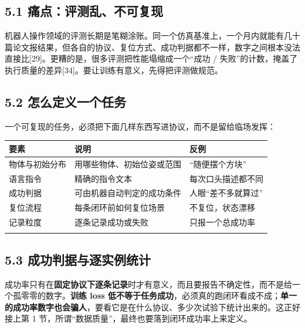 \documentclass[
  chinese,
]{ctexart}
\begin{document}
\subsection{5.1
痛点：评测乱、不可复现}\label{ux75dbux70b9ux8bc4ux6d4bux4e71ux4e0dux53efux590dux73b0}

机器人操作领域的评测长期是笔糊涂账。同一个仿真基准上，一个月内就能有几十篇论文报结果，但各自的协议、复位方式、成功判据都不一样，数字之间根本没法直接比{[}29{]}。更糟的是，很多评测把性能塌缩成一个``成功
/
失败''的计数，掩盖了执行质量的差异{[}34{]}。要让训练有意义，先得把评测做规范。

\subsection{5.2
怎么定义一个任务}\label{ux600eux4e48ux5b9aux4e49ux4e00ux4e2aux4efbux52a1}

一个可复现的任务，必须把下面几样东西写进协议，而不是留给临场发挥：

\begin{center}
\begin{tabular}{@{}>{\raggedright\arraybackslash}p{} >{\raggedright\arraybackslash}p{} >{\raggedright\arraybackslash}p{}@{}}
\toprule\noalign{}
要素 & 说明 & 反例 \\
\midrule\noalign{}
物体与初始分布 & 用哪些物体、初始位姿或范围 & ``随便摆个方块'' \\
语言指令 & 精确的指令文本 & 每次口头描述都不同 \\
成功判据 & 可由机器自动判定的成功条件 & 人眼``差不多就算过'' \\
复位流程 & 每条闭环前如何复位场景 & 不复位，状态漂移 \\
记录粒度 & 逐条记录成功或失败 & 只报一个总成功率 \\
\bottomrule\noalign{}
\end{tabular}
\end{center}

\subsection{5.3
成功判据与逐实例统计}\label{ux6210ux529fux5224ux636eux4e0eux9010ux5b9eux4f8bux7edfux8ba1}

成功率只有在\textbf{固定协议下逐条记录}时才有意义，而且要报告不确定性，而不是给一个孤零零的数字。\textbf{训练
loss
低不等于任务成功}，必须真的跑闭环看成不成；\textbf{单一的成功率数字也会骗人}，要看它是在什么协议、多少次试验下统计出来的。这正好接上第
1 节，所谓``数据质量''，最终也要落到闭环成功率上来定义。
\end{document}
